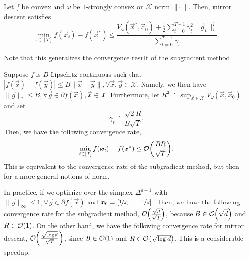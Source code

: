\begin{theorem}
    Let $f$ be convex and $\omega$ be $1$-strongly convex on $\mathcal{X}$ \wrt norm $\| \cdot \|$.
    Then, mirror descent satisfies \[
        \min_{t \in [T]} f(\vec{x}_t) - f(\vec{x}^\star) \leq \frac{V_{\omega}(\vec{x}^\star, \vec{x}_0) + \frac{1}{2} \sum_{t=0}^{T-1} \gamma_t^2 \| \vec{g}_t \|_*^2}{\sum_{t=0}^{T-1} \gamma_t}.
    \]
\end{theorem}

Note that this generalizes the convergence result of the subgradient method.

Suppose $f$ is $B$-Lipschitz continuous such that $| f(\vec{x}) - f(\vec{y}) | \leq B \| \vec{x} -
    \vec{y} \|, \forall \vec{x}, \vec{y} \in \mathcal{X}$. Namely, we then have $\| \vec{g} \|_* \leq
    B, \forall \vec{g} \in \partial f(\vec{x}), \vec{x} \in \mathcal{X}$. Furthermore, let $R^2 \doteq
    \sup_{\vec{x} \in \mathcal{X}} V_{\omega}(\vec{x}, \vec{x}_0)$ and set \[
    \gamma_t \doteq \frac{\sqrt{2} R}{B \sqrt{T}}.
\]
Then, we have the following convergence rate, \[
    \min_{t \in [T]} f(\vec{x}_t) - f(\vec{x}^\star) \leq \bigo{\frac{BR}{\sqrt{T}}}.
\]
This is equivalent to the convergence rate of the subgradient method, but then for a more general
notions of norm.

In practice, if we optimize over the simplex $\Delta^{d-1}$ with $\| \vec{g} \|_\infty \leq 1,
    \forall \vec{g} \in \partial f(\vec{x})$ and $\vec{x}_0 = [\nicefrac{1}{d}, \ldots,
    \nicefrac{1}{d}]$. Then, we have the following convergence rate for the subgradient method,
$\bigo{\frac{\sqrt{d}}{\sqrt{T}}}$, because $B \in \bigo{\sqrt{d}}$ and $R \in \bigo{1}$. On the
other hand, we have the following convergence rate for mirror descent, $\bigo{\frac{\sqrt{\log
                d}}{\sqrt{T}}}$, since $B \in \bigo{1}$ and $R \in \bigo{\sqrt{\log d}}$. This is a considerable
speedup.
